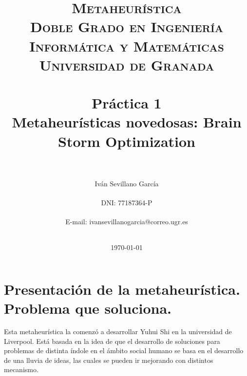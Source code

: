 


\title{	
\normalfont \normalsize 
\textsc{\textbf{Metaheurística} \\ Doble Grado en Ingeniería Informática y Matemáticas \\ Universidad de Granada} \\ [25pt] %
\horrule{0.5pt} \\[0.4cm] %
\Huge Práctica 1\\
\LARGE Metaheurísticas novedosas: Brain Storm Optimization
 \\ %
\horrule{2pt} \\[0.5cm] %
}

\author{ Iván Sevillano García \\\\
	DNI: 77187364-P\\ \\
	E-mail: ivansevillanogarcia@correo.ugr.es\\\\
	} %

\date{\normalsize\today} %




\maketitle %

\newpage

\tableofcontents
\newpage

\section{Presentación de la metaheurística. Problema que soluciona.}

Esta metaheurística la comenzó a desarrollar Yuhui Shi en la universidad de Liverpool\cite{BSO}. Está basada en la idea de que el desarrollo de soluciones para problemas de distinta índole en el ámbito social humano se basa en el desarrollo de una lluvia de ideas, las cuales se pueden ir mejorando con distintos mecanismo. \\

